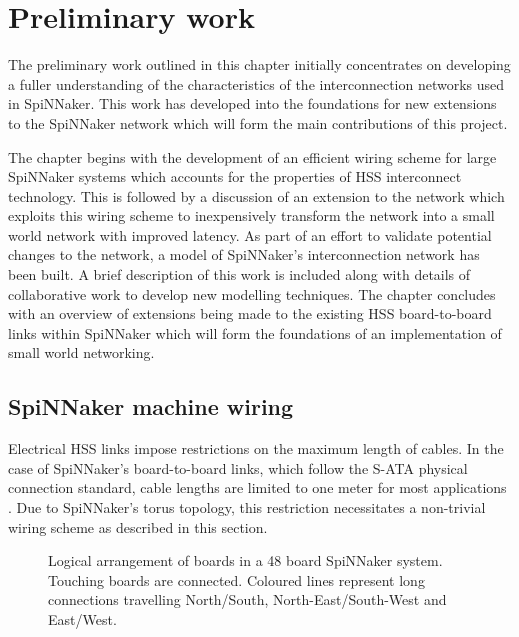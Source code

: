 \chapter{Preliminary work}
	\label{sec:preliminary-work}
	
	
	The preliminary work outlined in this chapter initially concentrates on
	developing a fuller understanding of the characteristics of the
	interconnection networks used in SpiNNaker. This work has developed into the
	foundations for new extensions to the SpiNNaker network which will form the
	main contributions of this project.
	
	The chapter begins with the development of an efficient wiring scheme for
	large SpiNNaker systems which accounts for the properties of HSS interconnect
	technology. This is followed by a discussion of an extension to the network
	which exploits this wiring scheme to inexpensively transform the network into
	a small world network with improved latency.  As part of an effort to validate
	potential changes to the network, a model of SpiNNaker's interconnection
	network has been built. A brief description of this work is included along
	with details of collaborative work to develop new modelling techniques.  The
	chapter concludes with an overview of extensions being made to the existing
	HSS board-to-board links within SpiNNaker which will form the foundations of
	an implementation of small world networking.
	
	\section{SpiNNaker machine wiring}
		
		
		Electrical HSS links impose restrictions on the maximum length of cables. In
		the case of SpiNNaker's board-to-board links, which follow the S-ATA
		physical connection standard, cable lengths are limited to one meter for
		most applications \cite{sata3spec}. Due to SpiNNaker's torus topology, this
		restriction necessitates a non-trivial wiring scheme as described in this
		section.
		
		\begin{figure}
			\center
			
			\caption[Logical arrangement of boards in a 48 board SpiNNaker
			system.]{Logical arrangement of boards in a 48 board SpiNNaker system.
			Touching boards are connected. Coloured lines represent long connections
			travelling {\color{red}North/South},
			{\color{green}North-East/South-West} and {\color{blue}East/West}.}
			\label{fig:boardsLogical}
		\end{figure}
		
